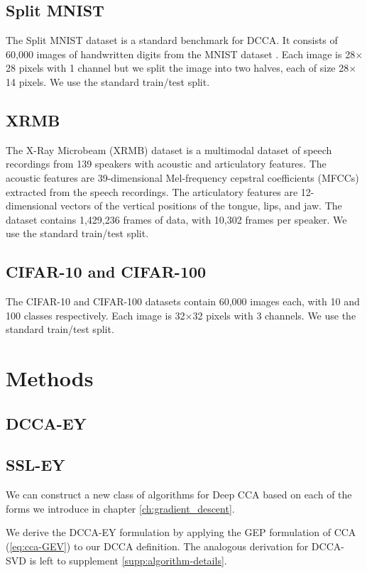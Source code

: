 \subsection{Split MNIST}
The Split MNIST dataset \cite{wang2015stochastic} is a standard benchmark for DCCA. It consists of 60,000 images of handwritten digits from the MNIST dataset \cite{lecun1998gradient}. Each image is 28$\times$28 pixels with 1 channel but we split the image into two halves, each of size 28$\times$14 pixels. We use the standard train/test split.

\subsection{XRMB}
The X-Ray Microbeam (XRMB) dataset \cite{westbury1994x} is a multimodal dataset of speech recordings from 139 speakers with acoustic and articulatory features. The acoustic features are 39-dimensional Mel-frequency cepstral coefficients (MFCCs) extracted from the speech recordings. The articulatory features are 12-dimensional vectors of the vertical positions of the tongue, lips, and jaw. The dataset contains 1,429,236 frames of data, with 10,302 frames per speaker. We use the standard train/test split.

\subsection{CIFAR-10 and CIFAR-100}
The CIFAR-10 and CIFAR-100 datasets contain 60,000 images each, with 10 and 100 classes respectively. Each image is 32$\times$32 pixels with 3 channels. We use the standard train/test split.


\section{Methods}
\subsection{DCCA-EY}

\subsection{SSL-EY}

We can construct a new class of algorithms for Deep CCA based on each of the forms we introduce in chapter \ref{ch:gradient_descent}.

We derive the DCCA-EY formulation by applying the GEP formulation of CCA (\ref{eq:cca-GEV}) to our DCCA definition. The analogous derivation for DCCA-SVD is left to supplement \ref{supp:algorithm-details}. 

